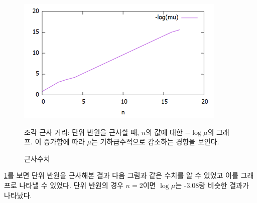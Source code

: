 \documentclass{gshs_thesis}
\theoremstyle{theorem}
\theoremstyle{lemma}
\theoremstyle{definition}
\begin{document}
\begin{figure}[h] 
	\centering
	\includegraphics[width=.4\textwidth]{image/BCerror}
	\caption{근사수치} 
	\label{fig:sp}
	\raggedright
	\small 조각 근사 거리: 단위 반원을 근사할 때, $n$의 값에 대한 $-\log\mu$의 그래프. 이 증가함에 따라 $\mu$는 기하급수적으로 감소하는 경향을 보인다. 
\end{figure}
\cref{fig:sp}를 보면 단위 반원을 근사해본 결과 다음 그림과 같은 수치를 알 수 있었고 이를 그래프로 나타낼 수 있었다.
단위 반원의 경우 $n=2$이면 $\log\mu$는 -3.08랑 비슷한 결과가 나타났다.
\end{document}
